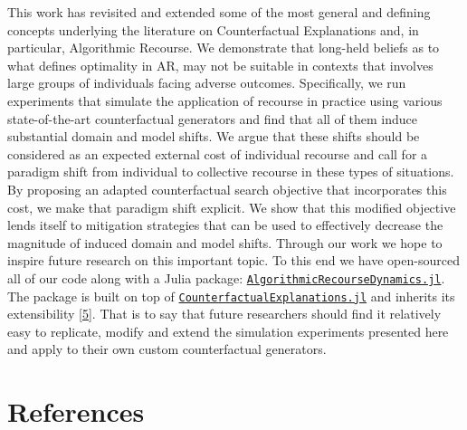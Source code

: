 \documentclass[conference,final,]{IEEEtran}
\theoremstyle{definition}
\theoremstyle{definition}
\theoremstyle{definition}
\theoremstyle{definition}
\theoremstyle{remark}
\begin{document}
This work has revisited and extended some of the most general and defining concepts underlying the literature on Counterfactual Explanations and, in particular, Algorithmic Recourse. We demonstrate that long-held beliefs as to what defines optimality in AR, may not be suitable in contexts that involves large groups of individuals facing adverse outcomes. Specifically, we run experiments that simulate the application of recourse in practice using various state-of-the-art counterfactual generators and find that all of them induce substantial domain and model shifts. We argue that these shifts should be considered as an expected external cost of individual recourse and call for a paradigm shift from individual to collective recourse in these types of situations. By proposing an adapted counterfactual search objective that incorporates this cost, we make that paradigm shift explicit. We show that this modified objective lends itself to mitigation strategies that can be used to effectively decrease the magnitude of induced domain and model shifts. Through our work we hope to inspire future research on this important topic. To this end we have open-sourced all of our code along with a Julia package: \href{https://anonymous.4open.science/r/AlgorithmicRecourseDynamics/README.md}{\texttt{AlgorithmicRecourseDynamics.jl}}. The package is built on top of \href{https://github.com/pat-alt/CounterfactualExplanations.jl}{\texttt{CounterfactualExplanations.jl}} and inherits its extensibility \protect\hyperlink{ref-altmeyer2022counterfactualexplanations}{{[}5{]}}. That is to say that future researchers should find it relatively easy to replicate, modify and extend the simulation experiments presented here and apply to their own custom counterfactual generators.

\hypertarget{references}{%
\section*{References}\label{references}}
\end{document}
